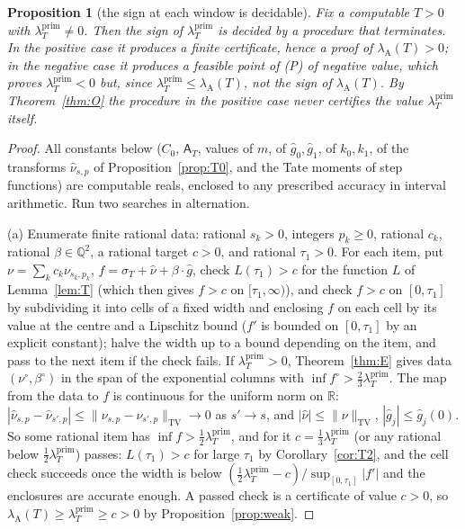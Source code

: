 \documentclass[11pt]{amsart}
\newtheorem{proposition}[theorem]{Proposition}
\theoremstyle{definition}
\theoremstyle{remark}
\newcommand{\R}{\mathbb R}
\newcommand{\Q}{\mathbb Q}
\newcommand{\TV}{\operatorname{TV}}
\newcommand{\lamP}{\lambda^{\mathrm{prim}}_T}
\newcommand{\lamA}{\lambda_{\mathrm A}(T)}
\newcommand{\sT}{\sigma_T}
\newcommand{\gh}[1]{\widehat g_{#1}}
\newcommand{\nuh}{\widehat\nu}
\newcommand{\Aconst}{\mathsf A_T}
\begin{document}
\begin{proposition}[the sign at each window is decidable]\label{prop:decide}
Fix a computable $T>0$ with $\lamP\ne0$. Then the sign of $\lamP$ is decided by a procedure that
terminates. In the positive case it produces a finite certificate, hence a proof of $\lamA>0$; in the
negative case it produces a feasible point of \textup{(P)} of negative value, which proves $\lamP<0$ but, since
$\lamP\le\lamA$, not the sign of $\lamA$. By Theorem~\ref{thm:O} the procedure in the positive case
never certifies the value $\lamP$ itself.
\end{proposition}
\begin{proof}
All constants below ($C_0$, $\Aconst$, values of $m$, of $\gh0,\gh1$, of $k_0,k_1$, of the transforms
$\nuh_{s,p}$ of Proposition~\ref{prop:T0}, and the Tate moments of step functions) are computable reals,
enclosed to any prescribed accuracy in interval arithmetic. Run two searches in alternation.

(a) Enumerate finite rational data: rational $s_k>0$, integers $p_k\ge0$, rational $c_k$, rational
$\beta\in\Q^2$, a rational target $c>0$, and rational $\tau_1>0$. For each item, put
$\nu=\sum_kc_k\nu_{s_k,p_k}$, $f=\sT+\nuh+\beta\cdot\widehat g$, check $L(\tau_1)>c$ for the function $L$
of Lemma~\ref{lem:T} (which then gives $f>c$ on $[\tau_1,\infty)$), and check $f>c$ on $[0,\tau_1]$ by
subdividing it into cells of a fixed width and enclosing $f$ on each cell by its value at the centre
and a Lipschitz bound ($f'$ is bounded on $[0,\tau_1]$ by an explicit constant); halve the width up to a
bound depending on the item, and pass to the next item if the check fails. If $\lamP>0$, Theorem~\ref{thm:E}
gives data $(\nu^\circ,\beta^\circ)$ in the span of the exponential columns with
$\inf f^\circ>\frac23\lamP$. The map from the data to $f$ is continuous for the uniform norm on $\R$:
$|\nuh_{s,p}-\nuh_{s',p}|\le\|\nu_{s,p}-\nu_{s',p}\|_{\TV}\to0$ as $s'\to s$, and
$|\nuh|\le\|\nu\|_{\TV}$, $|\gh j|\le\gh j(0)$. So some rational item has $\inf f>\frac12\lamP$, and for
it $c=\frac13\lamP$ (or any rational below $\frac12\lamP$) passes: $L(\tau_1)>c$ for large $\tau_1$ by
Corollary~\ref{cor:T2}, and the cell check succeeds once the width is below
$(\frac12\lamP-c)/\sup_{[0,\tau_1]}|f'|$ and the enclosures are accurate enough. A passed check is a
certificate of value $c>0$, so $\lamA\ge\lamP\ge c>0$ by Proposition~\ref{prop:weak}.


\end{proof}
\end{document}
